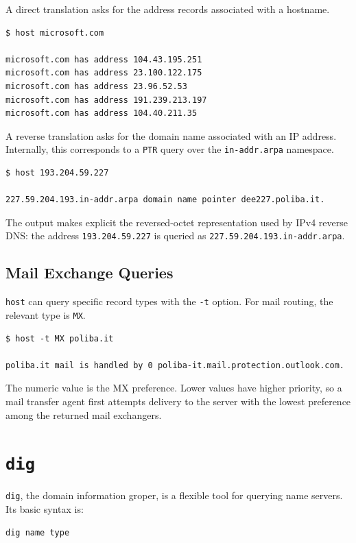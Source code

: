 \documentclass{scrbook}
\begin{document}
	A direct translation asks for the address records associated with a hostname.
	
	\begin{lstlisting}
$ host microsoft.com

microsoft.com has address 104.43.195.251
microsoft.com has address 23.100.122.175
microsoft.com has address 23.96.52.53
microsoft.com has address 191.239.213.197
microsoft.com has address 104.40.211.35
	\end{lstlisting}
	
	A reverse translation asks for the domain name associated with an IP address. Internally, this corresponds to a \texttt{PTR} query over the \texttt{in-addr.arpa} namespace.
	
	\begin{lstlisting}
$ host 193.204.59.227

227.59.204.193.in-addr.arpa domain name pointer dee227.poliba.it.
	\end{lstlisting}
	
	The output makes explicit the reversed-octet representation used by IPv4 reverse DNS: the address \texttt{193.204.59.227} is queried as \texttt{227.59.204.193.in-addr.arpa}.
	
	\subsection{Mail Exchange Queries}
	
	\texttt{host} can query specific record types with the \texttt{-t} option. For mail routing, the relevant type is \texttt{MX}.
	
	\begin{lstlisting}
$ host -t MX poliba.it

poliba.it mail is handled by 0 poliba-it.mail.protection.outlook.com.
	\end{lstlisting}
	
	The numeric value is the MX preference. Lower values have higher priority, so a mail transfer agent first attempts delivery to the server with the lowest preference among the returned mail exchangers.
	
	\section{\texttt{dig}}
	
	\texttt{dig}, the domain information groper, is a flexible tool for querying name servers. Its basic syntax is:
	
	\begin{lstlisting}
dig name type
	\end{lstlisting}
	
\end{document}
